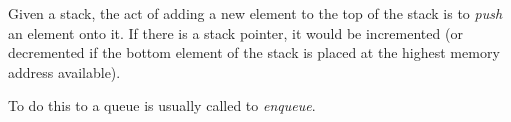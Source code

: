 \documentclass[12pt]{article}
\begin{document}
Given a stack, the act of adding a new element to the top of the stack is to \emph{push} an element onto it. If there is a stack pointer, it would be incremented (or decremented if the bottom element of the stack is placed at the highest memory address available).

To do this to a queue is usually called to \emph{enqueue}.
\end{document}
